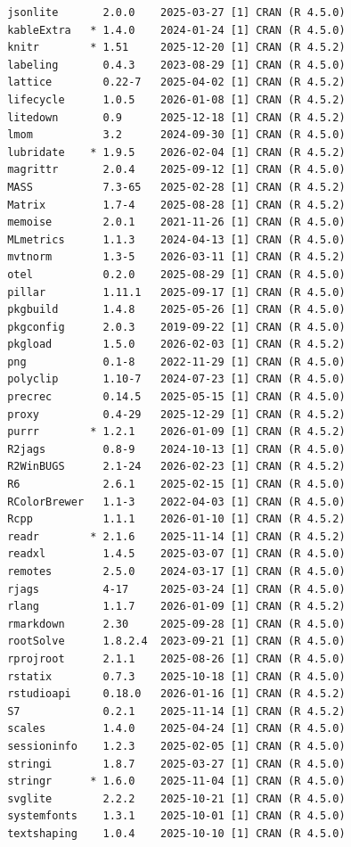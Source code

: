 \documentclass[article]{jss}
\begin{document}
\begin{tcolorbox}[enhanced jigsaw, arc=.35mm, bottomrule=.15mm, breakable, colback=white, colframe=quarto-callout-color-frame, left=2mm, leftrule=.75mm, opacityback=0, rightrule=.15mm, toprule=.15mm]
\begin{verbatim}
 jsonlite       2.0.0    2025-03-27 [1] CRAN (R 4.5.0)
 kableExtra   * 1.4.0    2024-01-24 [1] CRAN (R 4.5.0)
 knitr        * 1.51     2025-12-20 [1] CRAN (R 4.5.2)
 labeling       0.4.3    2023-08-29 [1] CRAN (R 4.5.0)
 lattice        0.22-7   2025-04-02 [1] CRAN (R 4.5.2)
 lifecycle      1.0.5    2026-01-08 [1] CRAN (R 4.5.2)
 litedown       0.9      2025-12-18 [1] CRAN (R 4.5.2)
 lmom           3.2      2024-09-30 [1] CRAN (R 4.5.0)
 lubridate    * 1.9.5    2026-02-04 [1] CRAN (R 4.5.2)
 magrittr       2.0.4    2025-09-12 [1] CRAN (R 4.5.0)
 MASS           7.3-65   2025-02-28 [1] CRAN (R 4.5.2)
 Matrix         1.7-4    2025-08-28 [1] CRAN (R 4.5.2)
 memoise        2.0.1    2021-11-26 [1] CRAN (R 4.5.0)
 MLmetrics      1.1.3    2024-04-13 [1] CRAN (R 4.5.0)
 mvtnorm        1.3-5    2026-03-11 [1] CRAN (R 4.5.2)
 otel           0.2.0    2025-08-29 [1] CRAN (R 4.5.0)
 pillar         1.11.1   2025-09-17 [1] CRAN (R 4.5.0)
 pkgbuild       1.4.8    2025-05-26 [1] CRAN (R 4.5.0)
 pkgconfig      2.0.3    2019-09-22 [1] CRAN (R 4.5.0)
 pkgload        1.5.0    2026-02-03 [1] CRAN (R 4.5.2)
 png            0.1-8    2022-11-29 [1] CRAN (R 4.5.0)
 polyclip       1.10-7   2024-07-23 [1] CRAN (R 4.5.0)
 precrec        0.14.5   2025-05-15 [1] CRAN (R 4.5.0)
 proxy          0.4-29   2025-12-29 [1] CRAN (R 4.5.2)
 purrr        * 1.2.1    2026-01-09 [1] CRAN (R 4.5.2)
 R2jags         0.8-9    2024-10-13 [1] CRAN (R 4.5.0)
 R2WinBUGS      2.1-24   2026-02-23 [1] CRAN (R 4.5.2)
 R6             2.6.1    2025-02-15 [1] CRAN (R 4.5.0)
 RColorBrewer   1.1-3    2022-04-03 [1] CRAN (R 4.5.0)
 Rcpp           1.1.1    2026-01-10 [1] CRAN (R 4.5.2)
 readr        * 2.1.6    2025-11-14 [1] CRAN (R 4.5.2)
 readxl         1.4.5    2025-03-07 [1] CRAN (R 4.5.0)
 remotes        2.5.0    2024-03-17 [1] CRAN (R 4.5.0)
 rjags          4-17     2025-03-24 [1] CRAN (R 4.5.0)
 rlang          1.1.7    2026-01-09 [1] CRAN (R 4.5.2)
 rmarkdown      2.30     2025-09-28 [1] CRAN (R 4.5.0)
 rootSolve      1.8.2.4  2023-09-21 [1] CRAN (R 4.5.0)
 rprojroot      2.1.1    2025-08-26 [1] CRAN (R 4.5.0)
 rstatix        0.7.3    2025-10-18 [1] CRAN (R 4.5.0)
 rstudioapi     0.18.0   2026-01-16 [1] CRAN (R 4.5.2)
 S7             0.2.1    2025-11-14 [1] CRAN (R 4.5.2)
 scales         1.4.0    2025-04-24 [1] CRAN (R 4.5.0)
 sessioninfo    1.2.3    2025-02-05 [1] CRAN (R 4.5.0)
 stringi        1.8.7    2025-03-27 [1] CRAN (R 4.5.0)
 stringr      * 1.6.0    2025-11-04 [1] CRAN (R 4.5.0)
 svglite        2.2.2    2025-10-21 [1] CRAN (R 4.5.0)
 systemfonts    1.3.1    2025-10-01 [1] CRAN (R 4.5.0)
 textshaping    1.0.4    2025-10-10 [1] CRAN (R 4.5.0)

\end{verbatim}
\end{tcolorbox}
\end{document}
